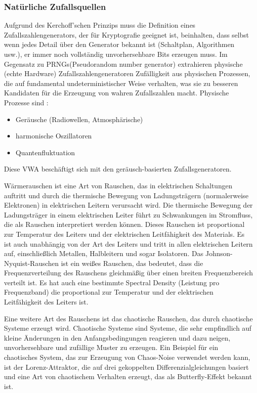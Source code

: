 \subsubsection{Natürliche Zufallsquellen}
Aufgrund des Kerchoff'schen Prinzips muss die Definition eines Zufallszahlengenerators, der für Kryptografie geeignet ist, beinhalten, 
dass selbst wenn jedes Detail über den Generator bekannt ist (Schaltplan, Algorithmen usw.), er immer noch vollständig unvorhersehbare 
Bits erzeugen muss. Im Gegensatz zu PRNGs(Pseudorandom number generator) extrahieren physische (echte Hardware) Zufallszahlengeneratoren 
Zufälligkeit aus physischen Prozessen, die auf fundamental undeterministischer Weise verhalten, was sie zu besseren Kandidaten für die 
Erzeugung von wahren Zufallszahlen macht. Physische Prozesse sind :
\begin{itemize}
    \item Geräusche (Radiowellen, Atmosphärische)
    \item harmonische Oszillatoren
    \item Quantenfluktuation
  \end{itemize}
Diese VWA beschäftigt sich mit den geräusch-basierten Zufallsgeneratoren.

Wärmerauschen ist eine Art von Rauschen, das in elektrischen Schaltungen auftritt und durch die thermische Bewegung von Ladungsträgern
(normalerweise Elektronen) in elektrischen Leitern verursacht wird. Die thermische Bewegung der Ladungsträger in einem elektrischen Leiter führt 
zu Schwankungen im Stromfluss, die als Rauschen interpretiert werden können. Dieses Rauschen ist proportional zur Temperatur des Leiters und der 
elektrischen Leitfähigkeit des Materials. Es ist auch unabhängig von der Art des Leiters und tritt in allen elektrischen Leitern auf, 
einschließlich Metallen, Halbleitern und sogar Isolatoren. Das Johnson-Nyquist-Rauschen ist ein weißes Rauschen, das bedeutet, dass die 
Frequenzverteilung des Rauschens gleichmäßig über einen breiten Frequenzbereich verteilt ist. Es hat auch eine bestimmte Spectral Density 
(Leistung pro Frequenzband) die proportional zur Temperatur und der elektrischen Leitfähigkeit des Leiters ist.

Eine weitere Art des Rauschens ist das chaotische Rauschen, das durch chaotische Systeme erzeugt wird. Chaotische Systeme sind Systeme, die sehr 
empfindlich auf kleine Änderungen in den Anfangsbedingungen reagieren und dazu neigen, unvorhersehbare und zufällige Muster zu erzeugen. Ein Beispiel 
für ein chaotisches System, das zur Erzeugung von Chaos-Noise verwendet werden kann, ist der Lorenz-Attraktor, die auf drei gekoppelten 
Differenzialgleichungen basiert und eine Art von chaotischem Verhalten erzeugt, das als Butterfly-Effekt bekannt ist. 

